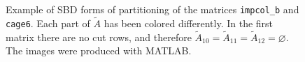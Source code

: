 \begin{figure}[h]
	\centering
	 \hspace{1cm}
	\caption{Example of SBD forms of partitioning of the matrices \texttt{impcol\_b} and \texttt{cage6}. Each part of $\tilde{A}$ has been colored differently. In the first matrix there are no cut rows, and therefore $\tilde{A}_{10}=\tilde{A}_{11} =\tilde{A}_{12} = \varnothing$. The images were produced with MATLAB.} \label{fig:sbd-2}
\end{figure}




